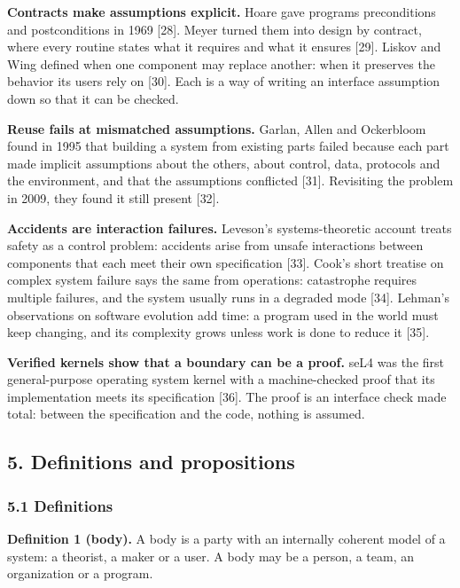 \documentclass[
  10pt,
]{article}
\begin{document}
\textbf{Contracts make assumptions explicit.} Hoare gave programs
preconditions and postconditions in 1969 {[}28{]}. Meyer turned them
into design by contract, where every routine states what it requires and
what it ensures {[}29{]}. Liskov and Wing defined when one component may
replace another: when it preserves the behavior its users rely on
{[}30{]}. Each is a way of writing an interface assumption down so that
it can be checked.

\textbf{Reuse fails at mismatched assumptions.} Garlan, Allen and
Ockerbloom found in 1995 that building a system from existing parts
failed because each part made implicit assumptions about the others,
about control, data, protocols and the environment, and that the
assumptions conflicted {[}31{]}. Revisiting the problem in 2009, they
found it still present {[}32{]}.

\textbf{Accidents are interaction failures.} Leveson's systems-theoretic
account treats safety as a control problem: accidents arise from unsafe
interactions between components that each meet their own specification
{[}33{]}. Cook's short treatise on complex system failure says the same
from operations: catastrophe requires multiple failures, and the system
usually runs in a degraded mode {[}34{]}. Lehman's observations on
software evolution add time: a program used in the world must keep
changing, and its complexity grows unless work is done to reduce it
{[}35{]}.

\textbf{Verified kernels show that a boundary can be a proof.} seL4 was
the first general-purpose operating system kernel with a machine-checked
proof that its implementation meets its specification {[}36{]}. The
proof is an interface check made total: between the specification and
the code, nothing is assumed.

\subsection{5. Definitions and
propositions}\label{definitions-and-propositions}

\subsubsection{5.1 Definitions}\label{definitions}

\textbf{Definition 1 (body).} A body is a party with an internally
coherent model of a system: a theorist, a maker or a user. A body may be
a person, a team, an organization or a program.
\end{document}
